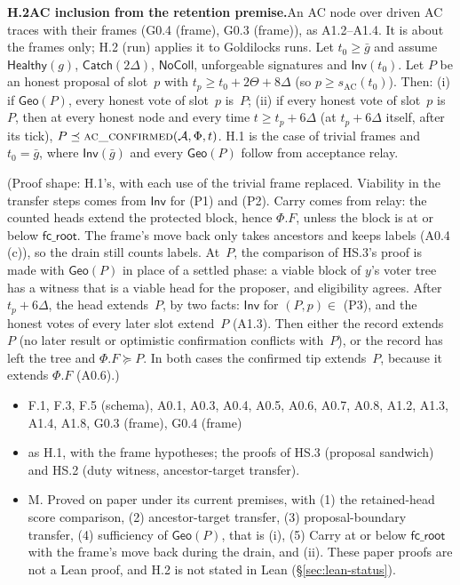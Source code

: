 \documentclass{article}
\newcommand{\AC}{\mathcal A}
\newcommand{\Fr}{\Phi}
\newcommand{\fcroot}{\mathsf{fc\_root}}
\newcommand{\fname}[1]{\text{\textsc{#1}}}
\newcommand{\dagnode}[6]{%
\par\medskip\noindent\textbf{#1\enspace #2.}\enspace #3
\begin{itemize}[leftmargin=2.2em,itemsep=0pt,topsep=2pt]
\item[\emph{Uses}] #4
\item[\emph{Evid.}] #5
\item[\emph{Task}] #6
\end{itemize}}
\begin{document}
\dagnode{H.2}{AC inclusion from the retention premise}{An AC node over driven
AC traces with their frames (G0.4 (frame), G0.3 (frame)), as A1.2--A1.4.  It
is about the frames only; H.2 (run) applies it to Goldilocks runs.  Let
$t_0\geq\bar g$ and assume $\mathsf{Healthy}(g)$, $\mathsf{Catch}(2\Delta)$,
$\mathsf{NoColl}$, unforgeable signatures and $\mathsf{Inv}(t_0)$.  Let $P$
be an honest proposal of slot~$p$ with $t_p\geq t_0+2\Theta+8\Delta$ (so
$p\geq s_{\mathrm{AC}}(t_0)$).  Then:
(i) if $\mathsf{Geo}(P)$, every honest vote of slot~$p$ is~$P$;
(ii) if every honest vote of slot~$p$ is~$P$, then at every honest node and
every time $t\geq t_p+6\Delta$ (at $t_p+6\Delta$ itself, after its tick),
$P\preceq\fname{ac\_confirmed}(\AC,\Fr,t)$.
H.1 is the case of trivial frames and $t_0=\bar g$, where
$\mathsf{Inv}(\bar g)$ and every $\mathsf{Geo}(P)$ follow from acceptance
relay.

(Proof shape: H.1's, with each use of the trivial frame replaced.
Viability in the transfer steps comes from $\mathsf{Inv}$ for (P1) and (P2).
Carry comes from relay: the counted heads extend the protected block, hence
$\Fr.F$, unless the block is at or below $\fcroot$.
The frame's move back only takes ancestors and keeps labels (A0.4 (c)), so
the drain still counts labels.
At~$P$, the comparison of HS.3's proof is made with $\mathsf{Geo}(P)$ in
place of a settled phase: a viable block of $y$'s voter tree has a witness
that is a viable head for the proposer, and eligibility agrees.
After $t_p+6\Delta$, the head extends~$P$, by two facts: $\mathsf{Inv}$ for
$(P,p)\in$ (P3), and the honest votes of every later slot extend~$P$ (A1.3).
Then either the record extends~$P$ (no later result or optimistic
confirmation conflicts with~$P$), or the record has left the tree and
$\Fr.F\succeq P$.  In both cases the confirmed tip extends~$P$, because it
extends $\Fr.F$ (A0.6).)}
{F.1, F.3, F.5 (schema), A0.1, A0.3, A0.4, A0.5, A0.6, A0.7, A0.8, A1.2,
A1.3, A1.4, A1.8, G0.3 (frame), G0.4 (frame)}
{as H.1, with the frame hypotheses; the proofs of HS.3 (proposal
sandwich) and HS.2 (duty witness, ancestor-target transfer).}
{M.  Proved on paper under its current premises, with (1) the retained-head
score comparison, (2) ancestor-target transfer, (3) proposal-boundary
transfer, (4) sufficiency of $\mathsf{Geo}(P)$, that is (i), (5) Carry at
or below $\fcroot$ with the frame's move back during the drain, and (ii).
These paper proofs are not a Lean proof, and H.2 is not stated in Lean
(\S\ref{sec:lean-status}).}
\end{document}
